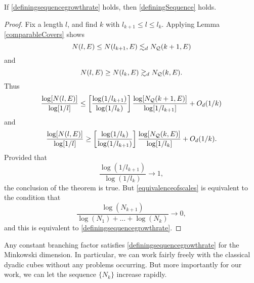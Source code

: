\begin{theorem} \label{definingsequenceminkowski}
	If \eqref{definingsequencegrowthrate} holds, then \eqref{definingSequence} holds.
\end{theorem}
\begin{proof}
	Fix a length $l$, and find $k$ with $l_{k+1} \leq l \leq l_k$. Applying Lemma \ref{comparableCovers} shows
	\[ N(l,E) \leq N(l_{k+1},E) \lesssim_d N_{\operatorname{\mathcal{Q}}}(k+1,E) \]
	and
	\[ N(l,E) \geq N(l_k,E) \gtrsim_d N_{\operatorname{\mathcal{Q}}}(k,E). \]
	Thus
	\[ \frac{\log[N(l,E)]}{\log[1/l]} \leq \left[ \frac{\log(1/l_{k+1})}{\log(1/l_k)} \right] \frac{\log[N_{\operatorname{\mathcal{Q}}}(k+1,E)]}{\log[1/l_{k+1}]} + O_d(1/k) \]
	and
	\[ \frac{\log[N(l,E)]}{\log[1/l]} \geq \left[ \frac{\log(1/l_k)}{\log(1/l_{k+1})} \right] \frac{\log[N_{\operatorname{\mathcal{Q}}}(k,E)]}{\log[1/l_k]} + O_d(1/k). \]
	Provided that
	\begin{equation} \label{equivalenceofscales}
		\frac{\log(1/l_{k+1})}{\log(1/l_k)} \to 1,
	\end{equation}
	the conclusion of the theorem is true. But \eqref{equivalenceofscales} is equivalent to the condition that
	\[ \frac{\log(N_{k+1})}{\log(N_1) + \dots + \log(N_k)} \to 0, \]
	and this is equivalent to \eqref{definingsequencegrowthrate}.
\end{proof}

Any constant branching factor satisfies \eqref{definingsequencegrowthrate} for the Minkowski dimension. In particular, we can work fairly freely with the classical dyadic cubes without any problems occurring. But more importantly for our work, we can let the sequence $\{ N_k \}$ increase rapidly.

